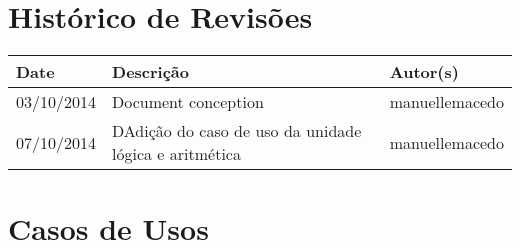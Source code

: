 \documentclass{article}
\begin{document}

\capa
\newpage

\section*{\center Histórico de Revisões}
  \vspace*{1cm}
  \begin{table}[ht]
    \centering
    \begin{tabular}[pos]{|m{2cm} | m{7.2cm} | m{3.8cm}|} 
      \hline
      \cellcolor[gray]{0.9}
      \textbf{Date} & \cellcolor[gray]{0.9}\textbf{Descrição} & \cellcolor[gray]{0.9}\textbf{Autor(s)}\\ \hline
      
      \small 03/10/2014 & \small Document conception & \small manuellemacedo \\ \hline      
	
      \small 07/10/2014 & \small DAdição do caso de uso da unidade lógica e aritmética & \small manuellemacedo \\ \hline
    \end{tabular}
  \end{table}

\newpage

\tableofcontents
\newpage





\section{Casos de Usos}

	

	
	
	

  
% 
% 
\end{document}
